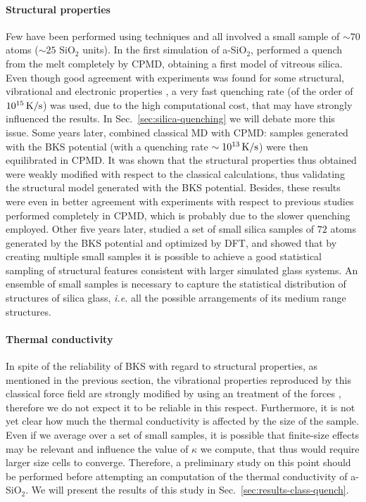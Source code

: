 \paragraph{Structural properties}
Few have been performed using \abinitio techniques and all involved a small sample of $\sim 70$ atoms ($\sim 25$ SiO$_2$ units). In the first \abinitio simulation of a-SiO$_2$, \citet{Sarnthein1995a} performed a quench from the melt completely by CPMD, obtaining a first model of vitreous silica. Even though good agreement with experiments was found for some structural, vibrational and electronic properties \cite{Sarnthein1995a,Sarnthein1995b,Sarnthein1997}, a very fast quenching rate (of the order of $10^{15}\,\mathrm{K/s}$) was used, due to the high computational cost, that may have strongly influenced the results. In Sec.~\ref{sec:silica-quenching} we will debate more this issue. 
Some years later, \citet{Benoit2000} combined classical MD with CPMD: samples generated with the BKS potential (with a quenching rate $\sim 10^{13}\,\mathrm{K/s}$) were then equilibrated in CPMD. It was shown that the structural properties thus obtained were weakly modified with respect to the classical calculations, thus validating the structural model generated with the BKS potential. Besides, these results were even in better agreement with experiments with respect to previous studies performed completely in CPMD, which is probably due to the slower quenching employed. 
Other five years later, \citet{VanGinhoven2005} studied a set of small silica samples of $72$ atoms generated by the BKS potential and optimized by DFT, and showed that by creating multiple small samples it is possible to achieve a good statistical sampling of structural features consistent with larger simulated glass systems. An ensemble of small samples is necessary to capture the statistical distribution of structures of silica glass, \emph{i.e.} all the possible arrangements of its medium range structures. 

\paragraph{Thermal conductivity}
In spite of the reliability of BKS with regard to structural properties, as mentioned in the previous section, the vibrational properties reproduced by this classical force field are strongly modified by using an \abinitio treatment of the forces \cite{Benoit2002}, therefore we do not expect it to be reliable in this respect. 
Furthermore, it is not yet clear how much the thermal conductivity is affected by the size of the sample. Even if we average over a set of small samples, it is possible that finite-size effects may be relevant and influence the value of $\kappa$ we compute, that thus would require larger size cells to converge. 
Therefore, a preliminary study on this point should be performed before attempting an \abinitio computation of the thermal conductivity of a-SiO$_2$. We will present the results of this study in Sec.~\ref{sec:results-class-quench}.



